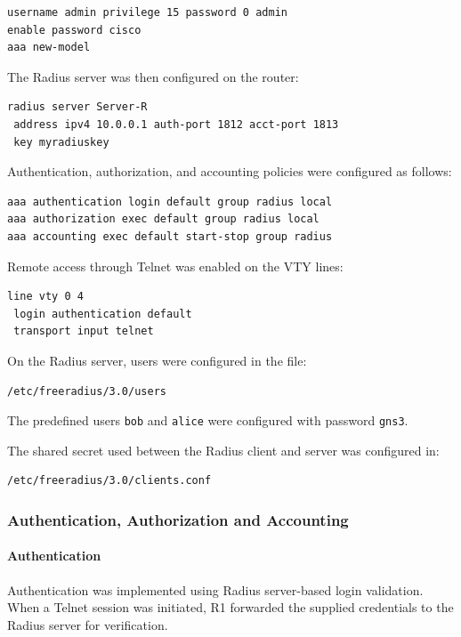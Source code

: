 \documentclass[12pt]{article}
\begin{document}
\begin{verbatim}
username admin privilege 15 password 0 admin
enable password cisco
aaa new-model
\end{verbatim}

The Radius server was then configured on the router:

\begin{verbatim}
radius server Server-R
 address ipv4 10.0.0.1 auth-port 1812 acct-port 1813
 key myradiuskey
\end{verbatim}

Authentication, authorization, and accounting policies were configured as follows:

\begin{verbatim}
aaa authentication login default group radius local
aaa authorization exec default group radius local
aaa accounting exec default start-stop group radius
\end{verbatim}

Remote access through Telnet was enabled on the VTY lines:

\begin{verbatim}
line vty 0 4
 login authentication default
 transport input telnet
\end{verbatim}

On the Radius server, users were configured in the file:

\begin{verbatim}
/etc/freeradius/3.0/users
\end{verbatim}

The predefined users \texttt{bob} and \texttt{alice} were configured with password \texttt{gns3}.

The shared secret used between the Radius client and server was configured in:

\begin{verbatim}
/etc/freeradius/3.0/clients.conf
\end{verbatim}

\subsubsection{Authentication, Authorization and Accounting}

\paragraph{Authentication}

Authentication was implemented using Radius server-based login validation. When a Telnet session was initiated, R1 forwarded the supplied credentials to the Radius server for verification.
\end{document}
